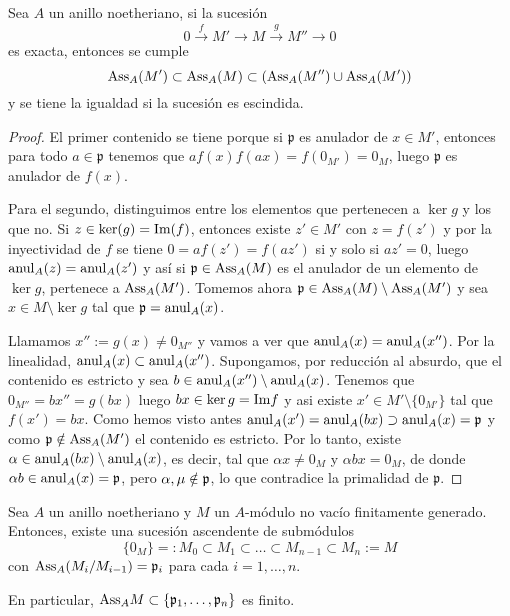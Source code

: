 \documentclass[../main.tex]{subfiles}
\begin{document}
\begin{lemma}\label{contenidos_assa}
Sea $A$ un anillo noetheriano, si la sucesión $$0\overset{f}{\longrightarrow} M'\longrightarrow M\overset{g}{\longrightarrow} M''\longrightarrow 0$$ es exacta, entonces se cumple $$\text{Ass}_A(M')\subset\text{Ass}_A(M)\subset\left (\text{Ass}_A(M'')\cup\text{Ass}_A(M')\right )$$ y se tiene la igualdad si la sucesión es escindida.
\end{lemma}\label{contenidos_assa}
\begin{proof}
El primer contenido se tiene porque si $\mathfrak{p}$ es anulador de $x \in M'$, entonces para todo $a \in \mathfrak{p}$ tenemos que $af(x)  f(ax) = f(0_{M'}) = 0_M$, luego $\mathfrak{p}$ es anulador de $f(x)$.

Para el segundo, distinguimos entre los elementos que pertenecen a $\ker g$ y los que no. Si $z\in\ker(g)= \text{Im}(f)$, entonces existe $z'\in M'$ con $z=f(z')$ y por la inyectividad de $f$ se tiene $0 = af(z') = f(az')$ si y solo si $az' = 0 $, luego $\operatorname{anul}_A(z)=\operatorname{anul}_A(z')$ y así si $\mathfrak{p}\in \text{Ass}_A(M)$ es el anulador de un elemento de $\ker g$, pertenece a $\text{Ass}_A(M')$. Tomemos ahora $\mathfrak{p}\in \text{Ass}_A(M) \setminus \text{Ass}_A(M') $ y sea $x\in M\setminus \ker g$ tal que $\mathfrak{p} = \operatorname{anul}_A(x)$.

Llamamos $x'':=g(x)\neq 0_{M''}$ y vamos a ver que $\operatorname{anul}_A(x)=\operatorname{anul}_A(x'')$. Por la linealidad, $\operatorname{anul}_A(x) \subset \operatorname{anul}_A(x'')$. Supongamos, por reducción al absurdo, que el contenido es estricto y sea $b \in\operatorname{anul}_A(x'')\setminus\operatorname{anul}_A(x)$. Tenemos que $0_{M''} = b x''=g(b x)$ luego $bx \in \ker g = \text{Im} f$ y asi existe $x'\in M'\setminus\{0_{M'}\}$ tal que $f(x')=b x$.
Como hemos visto antes $\operatorname{anul}_A(x')=\operatorname{anul}_A(b x)\supset\operatorname{anul}_A(x)=\mathfrak{p}$ y como $\mathfrak{p}\notin\text{Ass}_A(M')$ el contenido es estricto. Por lo tanto, existe $\alpha \in \operatorname{anul}_A(b x) \setminus\operatorname{anul}_A(x) $, es decir, tal que $\alpha x\neq 0_M$ y $\alpha b x=0_M$, de donde $\alpha b\in \operatorname{anul}_A(x) = \mathfrak{p}$, pero $\alpha,\mu\notin\mathfrak{p}$, lo que contradice la primalidad de $\mathfrak{p}$.
\end{proof}

\begin{proposition}
Sea $A$ un anillo noetheriano y $M$ un $A$-módulo no vacío finitamente generado. Entonces, existe una sucesión ascendente de submódulos $$\{0_M\}=:M_0\subset M_1\subset\dots\subset M_{n-1}\subset M_n:=M$$ con $\text{Ass}_A(M_i/M_{i-1})=\mathfrak{p}_i$ para cada $i=1,\dots,n$.

En particular, $\text{Ass}_AM\subset\{\mathfrak{p}_1,\dots,\mathfrak{p}_n\}$ es finito.
\end{proposition}
\end{document}
